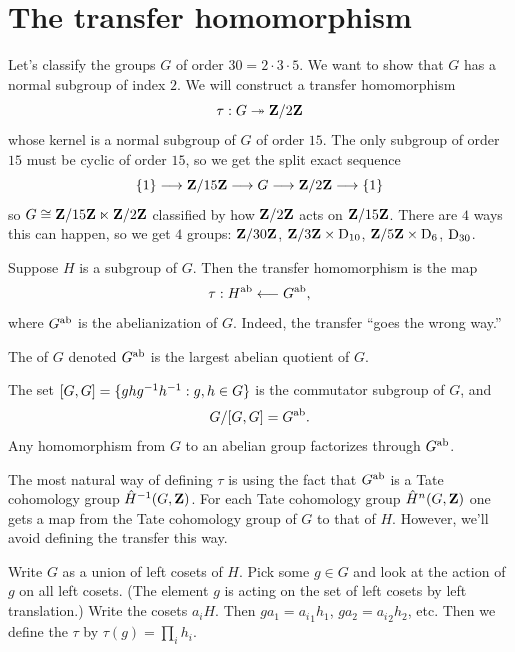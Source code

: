\documentclass[11pt, oneside]{amsart}
\begin{document}
\section{The transfer homomorphism} \label{transfer}
Let's classify the groups $G$ of order $30 = 2\cdot3\cdot5$. We want to show that $G$ has a normal subgroup of index $2$. We will construct a transfer homomorphism 
$$
\tau : G\twoheadrightarrow \mathbf Z / 2\mathbf Z 
$$
whose kernel is a normal subgroup of $G$ of order $15$. The only subgroup of order $15$ must be cyclic of order $15$, so we get the split exact sequence
$$
\{1\} \longrightarrow \mathbf Z / 15\mathbf Z \longrightarrow G \longrightarrow \mathbf Z / 2\mathbf Z \longrightarrow\{1\}
$$
so $G \cong \mathbf Z / 15\mathbf Z\ltimes \mathbf Z / 2\mathbf Z$ classified by how $\mathbf Z / 2\mathbf Z$ acts on $\mathbf Z / 15\mathbf Z$. There are $4$ ways this can happen, so we get $4$ groups: $\mathbf Z / 30\mathbf Z$, $\mathbf Z / 3\mathbf Z \times \operatorname{D}_{10}$, $\mathbf Z / 5\mathbf Z \times \operatorname{D}_6$, $\operatorname{D}_{30}$. 

Suppose $H$ is a subgroup of $G$. Then the transfer homomorphism is the map
$$
\tau : H\textsuperscript{ab} \longleftarrow G\textsuperscript{ab},
$$
where $G\textsuperscript{ab}$ is the abelianization of $G$. Indeed, the transfer ``goes the wrong way.''

\begin{definition}
The  of $G$ denoted $G\textsuperscript{ab}$ is the largest abelian quotient of $G$.
\end{definition}

The set $[G,G] = \{ ghg^{-1} h^{-1} : g,h\in G\}$ is the commutator subgroup of $G$, and 
$$
G / [G,G] = G\textsuperscript{ab}.
$$
Any homomorphism from $G$ to an abelian group factorizes through $G\textsuperscript {ab}$.

The most natural way of defining $\tau$ is using the fact that $G\textsuperscript {ab}$ is a  Tate cohomology group $\hat {H}^{-1} (G,\mathbf Z)$. For each Tate cohomology group $\hat H^n (G,\mathbf Z)$ one gets a map from the Tate cohomology group of $G$ to that of $H$. However, we'll avoid defining the transfer this way.


\begin{definition}
Write $G$ as a union of left cosets of $H$. Pick some $g\in G$ and look at the action of $g$ on all left cosets. (The element $g$ is acting on the set of left cosets by left translation.) Write the cosets $a_iH$. Then $ga_1 = {a_i}_1h_1$, $ga_2 = {a_i}_2h_2$, etc. Then we define the  $\tau$ by $\tau (g) = \prod_i h_i$.
\end{definition}
\end{document}
